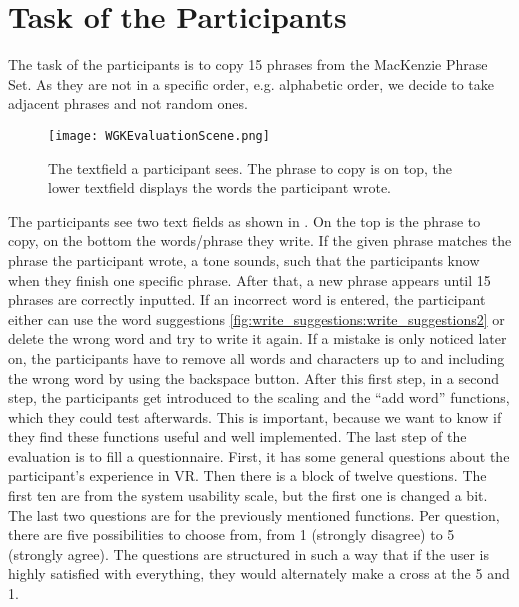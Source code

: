 \section{Task of the Participants}
The task of the participants is to copy 15 phrases from the MacKenzie Phrase Set. As they are not in a specific order, e.g. alphabetic order, we decide to take adjacent phrases and not random ones.
\begin{figure}[H]
    \centering
    \texttt{[image: WGKEvaluationScene.png]}
    \caption{The textfield a participant sees. The phrase to copy is on top, the lower textfield displays the words the participant wrote.}
    \label{fig:eval_scene}
\end{figure}
The participants see two text fields as shown in . On the top is the phrase to copy, on the bottom the words/phrase they write. If the given phrase matches the phrase the participant wrote, a tone sounds, such that the participants know when they finish one specific phrase. After that, a new phrase appears until 15 phrases are correctly inputted. If an incorrect word is entered, the participant either can use the word suggestions \cref{fig:write_suggestions:write_suggestions2} or delete the wrong word and try to write it again. If a mistake is only noticed later on, the participants have to remove all words and characters up to and including the wrong word by using the backspace button.\label{sec:eva_task} After this first step, in a second step, the participants get introduced to the scaling and the ``add word'' functions, which they could test afterwards. This is important, because we want to know if they find these functions useful and well implemented. The last step of the evaluation is to fill a questionnaire. First, it has some general questions about the participant's experience in VR. Then there is a block of twelve questions. The first ten are from the system usability scale, but the first one is changed a bit. The last two questions are for the previously mentioned functions. Per question, there are five possibilities to choose from, from 1 (strongly disagree) to 5 (strongly agree). The questions are structured in such a way that if the user is highly satisfied with everything, they would alternately make a cross at the 5 and 1.

